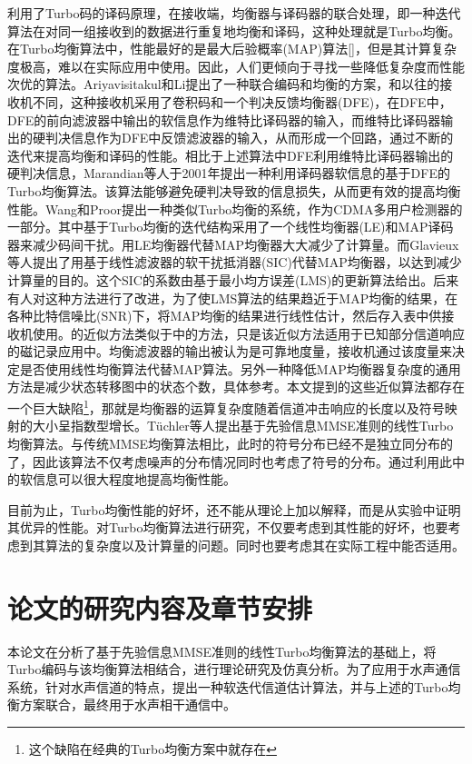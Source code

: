 利用了Turbo码的译码原理，在接收端，均衡器与译码器的联合处理，即一种迭代算法在对同一组接收到的数据进行重复地均衡和译码，这种处理就是Turbo均衡\cite{douillard1995,Anastasopoulos1997}。
在Turbo均衡算法中，性能最好的是最大后验概率(MAP)算法[]，但是其计算复杂度极高，难以在实际应用中使用。因此，人们更倾向于寻找一些降低复杂度而性能次优的算法。Ariyavisitakul和Li\cite{ariyavisitakul1998}提出了一种联合编码和均衡的方案，和以往的接收机不同，这种接收机采用了卷积码和一个判决反馈均衡器(DFE)，在DFE中，DFE的前向滤波器中输出的软信息作为维特比译码器的输入，而维特比译码器输出的硬判决信息作为DFE中反馈滤波器的输入，从而形成一个回路，通过不断的迭代来提高均衡和译码的性能。相比于上述算法中DFE利用维特比译码器\cite{Joachim1989}输出的硬判决信息，Marandian等人\cite{Marandian}于2001年提出一种利用译码器软信息的基于DFE的Turbo均衡算法。该算法能够避免硬判决导致的信息损失，从而更有效的提高均衡性能。Wang和Proor\cite{wang1999iterative}提出一种类似Turbo均衡的系统，作为CDMA多用户检测器的一部分。其中基于Turbo均衡的迭代结构采用了一个线性均衡器(LE)和MAP译码器来减少码间干扰。用LE均衡器代替MAP均衡器大大减少了计算量。而Glavieux\cite{glavieux1997turbo}等人提出了用基于线性滤波器的软干扰抵消器(SIC)代替MAP均衡器，以达到减少计算量的目的。这个SIC的系数由基于最小均方误差(LMS)的更新算法给出。后来有人对这种方法进行了改进，为了使LMS算法的结果趋近于MAP均衡的结果，在各种比特信噪比(SNR)下，将MAP均衡的结果进行线性估计，然后存入表中供接收机使用\cite{raphaeli2000}。\cite{wu2000turbo}的近似方法类似于\cite{glavieux1997turbo}中的方法，只是该近似方法适用于已知部分信道响应的磁记录应用中。均衡滤波器的输出被认为是可靠地度量，接收机通过该度量来决定是否使用线性均衡算法代替MAP算法。另外一种降低MAP均衡器复杂度的通用方法是减少状态转移图中的状态个数，具体参考\cite{Berthet2000}。本文提到的这些近似算法都存在一个巨大缺陷\footnote{这个缺陷在经典的Turbo均衡方案中就存在}，那就是均衡器的运算复杂度随着信道冲击响应的长度以及符号映射的大小呈指数型增长。T{\"u}chler\cite{Tuchler2002a,Tuchler,Tuchler2011}等人提出基于先验信息MMSE准则的线性Turbo均衡算法。与传统MMSE均衡算法相比，此时的符号分布已经不是独立同分布的了，因此该算法不仅考虑噪声的分布情况同时也考虑了符号的分布。通过利用此中的软信息可以很大程度地提高均衡性能。

目前为止，Turbo均衡性能的好坏，还不能从理论上加以解释，而是从实验中证明其优异的性能。对Turbo均衡算法进行研究，不仅要考虑到其性能的好坏，也要考虑到其算法的复杂度以及计算量的问题。同时也要考虑其在实际工程中能否适用。
\section{论文的研究内容及章节安排}
本论文在分析了基于先验信息MMSE准则的线性Turbo均衡算法的基础上，将Turbo编码与该均衡算法相结合，进行理论研究及仿真分析。为了应用于水声通信系统，针对水声信道的特点，提出一种软迭代信道估计算法，并与上述的Turbo均衡方案联合，最终用于水声相干通信中。

